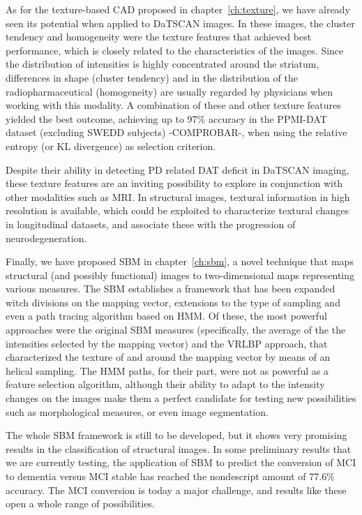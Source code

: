 As for the texture-based \ac{CAD} proposed in chapter~\ref{ch:texture}, we have already seen its potential when applied to DaTSCAN images. In these images, the cluster tendency and homogeneity were the texture features that achieved best performance, which is closely related to the characteristics of the images. Since the distribution of intensities is highly concentrated around the striatum, differences in shape (cluster tendency) and in the distribution of the radiopharmaceutical (homogeneity) are usually regarded by physicians when working with this modality. A combination of these and other texture features yielded the best outcome, achieving up to 97\% accuracy in the PPMI-DAT dataset (excluding \ac{SWEDD} subjects) -COMPROBAR-, when using the relative entropy (or \ac{KL} divergence) as selection criterion. 

Despite their ability in detecting \ac{PD} related \ac{DAT} deficit in DaTSCAN imaging, these texture features are an inviting possibility to explore in conjunction with other modalities such as \ac{MRI}. In structural images, textural information in high resolution is available, which could be exploited to characterize textural changes in longitudinal datasets, and associate these with the progression of neurodegeneration. 

Finally, we have proposed \ac{SBM} in chapter~\ref{ch:sbm}, a novel technique that maps structural (and possibly functional) images to two-dimensional maps representing various measures. The \ac{SBM} establishes a framework that has been expanded witch divisions on the mapping vector, extensions to the type of sampling and even a path tracing algorithm based on \ac{HMM}. Of these, the most powerful approaches were the original \ac{SBM} measures (specifically, the average of the the intensities selected by the mapping vector) and the \ac{VRLBP} approach, that characterized the texture of and around the mapping vector by means of an helical sampling. The \ac{HMM} paths, for their part, were not as powerful as a feature selection algorithm, although their ability to adapt to the intensity changes on the images make them a perfect candidate for testing new possibilities such as morphological measures, or even image segmentation. 

The whole \ac{SBM} framework is still to be developed, but it shows very promising results in the classification of structural images. In some preliminary results that we are currently testing, the application of \ac{SBM} to predict the conversion of \ac{MCI} to dementia versus \ac{MCI} stable has reached the nondescript amount of 77.6\% accuracy. The \ac{MCI} conversion is today a major challenge, and results like these open a whole range of possibilities. 

